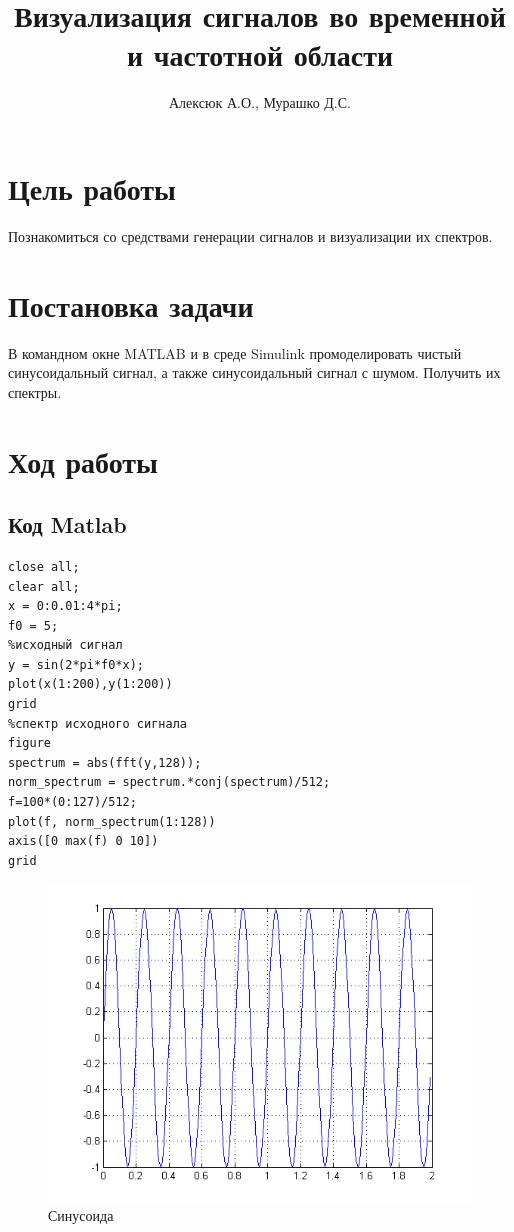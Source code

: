 \documentclass[a4paper, 12pt]{article}
\author{Алексюк А.О., Мурашко Д.С.}
\title{Визуализация сигналов во временной и частотной области}
\begin{document}
\maketitle
\tableofcontents
\pagebreak

\section{Цель работы}
Познакомиться со средствами генерации сигналов и визуализации их спектров.

\section{Постановка задачи}
В командном окне MATLAB и в среде Simulink промоделировать чистый синусоидальный сигнал, а также синусоидальный сигнал с шумом. Получить их спектры.

\section{Ход работы}

\subsection{Код Matlab}
\begin{lstlisting}
close all;
clear all;
x = 0:0.01:4*pi;
f0 = 5;
%исходный сигнал
y = sin(2*pi*f0*x);
plot(x(1:200),y(1:200))
grid
%спектр исходного сигнала 
figure
spectrum = abs(fft(y,128)); 
norm_spectrum = spectrum.*conj(spectrum)/512;
f=100*(0:127)/512;
plot(f, norm_spectrum(1:128))
axis([0 max(f) 0 10])
grid
\end{lstlisting}

\begin{figure}[H]
   \includegraphics[scale=0.7]{sin.png}
   \caption{Синусоида}
\end{figure}
\end{document}
